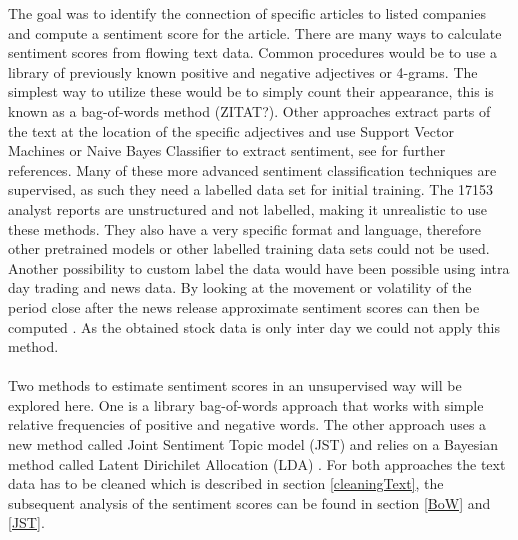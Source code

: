 The goal was to identify the connection of specific articles to listed companies and compute a sentiment score for the article. There are many ways to calculate sentiment scores from flowing text data. Common procedures would be to use a library of previously known positive and negative adjectives or 4-grams. The simplest way to utilize these would be to simply count their appearance, this is known as a bag-of-words method (ZITAT?). Other approaches extract parts of the text at the location of the specific adjectives and use Support Vector Machines or Naive Bayes Classifier to extract sentiment, see \citet{westerski2007sentiment} for further references. Many of these more advanced sentiment classification techniques are supervised, as such they need a labelled data set for initial training. The 17153 analyst reports are unstructured and not labelled, making it unrealistic to use these methods. They also have a very specific format and language, therefore other pretrained models or other labelled training data sets could not be used. Another possibility to custom label the data would have been possible using intra day trading and news data. By looking at the movement or volatility of the period close after the news release approximate sentiment scores can then be computed \citep{robertson2007news}. As the obtained stock data is only inter day we could not apply this method.
\\ \\
Two methods to estimate sentiment scores in an unsupervised way will be explored here. One is a library bag-of-words approach that works with simple relative frequencies of positive and negative words. The other approach uses a new method called Joint Sentiment Topic model (JST) \citep{lin2009joint} and relies on a Bayesian method called Latent Dirichilet Allocation (LDA)  \citep{blei2003latent}. For both approaches the text data has to be cleaned which is described in section \ref{cleaningText}, the subsequent analysis of the sentiment scores can be found in section \ref{BoW} and \ref{JST}.

